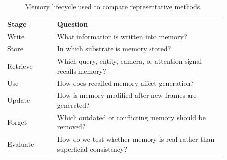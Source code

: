 \begin{table}[t]
\centering
\small
\begin{tabular}{p{0.2\linewidth}p{0.68\linewidth}}
\toprule
\textbf{Stage} & \textbf{Question} \\
\midrule
Write & What information is written into memory? \\
Store & In which substrate is memory stored? \\
Retrieve & Which query, entity, camera, or attention signal recalls memory? \\
Use & How does recalled memory affect generation? \\
Update & How is memory modified after new frames are generated? \\
Forget & Which outdated or conflicting memory should be removed? \\
Evaluate & How do we test whether memory is real rather than superficial consistency? \\
\bottomrule
\end{tabular}
\caption{Memory lifecycle used to compare representative methods.}
\label{tab:lifecycle}
\end{table}
